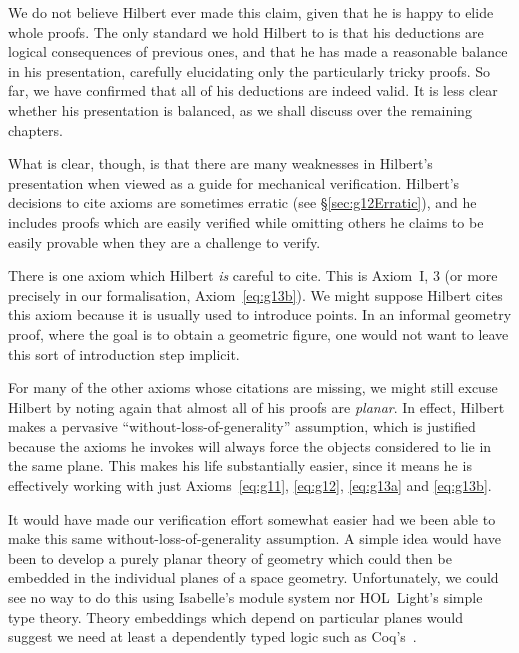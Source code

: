 We do not believe Hilbert ever made this claim, given that he is happy to elide whole proofs. The only standard we hold Hilbert to is that his deductions are logical consequences of previous ones, and that he has made a reasonable balance in his presentation, carefully elucidating only the particularly tricky proofs. So far, we have confirmed that all of his deductions are indeed valid. It is less clear whether his presentation is balanced, as we shall discuss over the remaining chapters. 

What is clear, though, is that there are many weaknesses in Hilbert's presentation when viewed as a guide for mechanical verification. Hilbert's decisions to cite axioms are sometimes erratic (see \S\ref{sec:g12Erratic}), and he includes proofs which are easily verified while omitting others he claims to be easily provable when they are a challenge to verify.

There is one axiom which Hilbert \emph{is} careful to cite. This is Axiom~I, 3 (or more precisely in our formalisation, Axiom~\ref{eq:g13b}). We might suppose Hilbert cites this axiom because it is usually used to introduce points. In an informal geometry proof, where the goal is to obtain a geometric figure, one would not want to leave this sort of introduction step implicit.

\label{sec:PlanarProofs}For many of the other axioms whose citations are missing, we might still excuse Hilbert by noting again that almost all of his proofs are \emph{planar}. In effect, Hilbert makes a pervasive ``without-loss-of-generality'' assumption, which is justified because the axioms he invokes will always force the objects considered to lie in the same plane. This makes his life substantially easier, since it means he is effectively working with just Axioms~\ref{eq:g11}, \ref{eq:g12}, \ref{eq:g13a} and \ref{eq:g13b}.

It would have made our verification effort somewhat easier had we been able to make this same without-loss-of-generality assumption. A simple idea would have been to develop a purely planar theory of geometry which could then be embedded in the individual planes of a space geometry. Unfortunately, we could see no way to do this using Isabelle's module system nor HOL~Light's simple type theory. Theory embeddings which depend on particular planes would suggest we need at least a dependently typed logic such as Coq's~\cite{Coq}.


